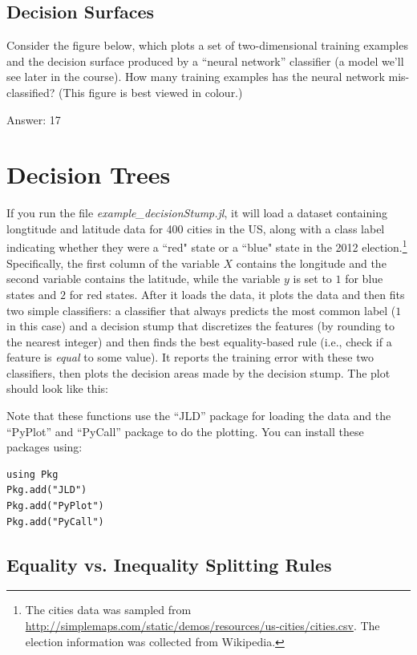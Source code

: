 \documentclass{article}
\def\ans#1{\par\gre{Answer: #1}}
\def\blu#1{{\color{blu}#1}}
\def\gre#1{{\color{gre}#1}}
\begin{document}
\subsection{Decision Surfaces}

Consider the figure below, which plots a set of two-dimensional training examples and the decision surface produced by a ``neural network'' classifier (a model we'll see later in the course).
\blu{How many training examples has the neural network mis-classified?} (This figure is best viewed in colour.)
\ans{17}

\section{Decision Trees}

If you run the file \emph{example\_decisionStump.jl}, it will load a dataset containing longtitude and latitude data for 400 cities in the US, along with a class label indicating whether they were a ``red" state or a ``blue" state in the 2012 election.\footnote{The cities data was sampled from \url{http://simplemaps.com/static/demos/resources/us-cities/cities.csv}. The election information was collected from Wikipedia.} Specifically, the first column of the variable $X$ contains the longitude and the second variable contains the latitude, while the variable $y$ is set to $1$ for blue states and $2$ for red states. After it loads the data, it plots the data and then fits two simple classifiers: a classifier that always predicts the most common label ($1$ in this case) and a decision stump that discretizes the features (by rounding to the nearest integer) and then finds the best equality-based rule (i.e., check if a feature is \emph{equal} to some value). It reports the training error with these two classifiers, then plots the decision areas made by the decision stump. The plot should look like this:

Note that these functions use the ``JLD'' package for loading the data and the ``PyPlot'' and ``PyCall'' package to do the plotting. You can install these packages using:
\begin{verbatim}
using Pkg
Pkg.add("JLD")
Pkg.add("PyPlot")
Pkg.add("PyCall")
\end{verbatim}

\subsection{Equality vs. Inequality Splitting Rules}
\end{document}
